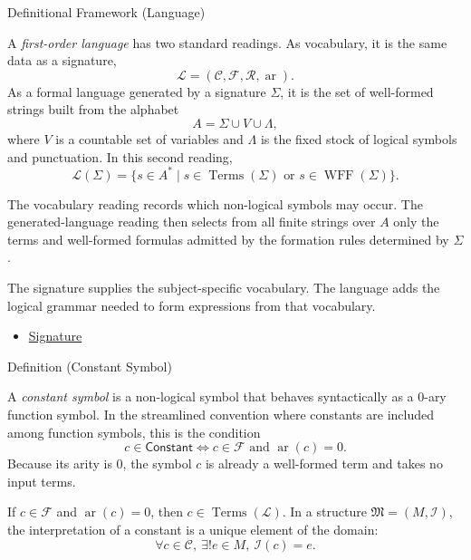 \begin{definitionalbox}{Definitional Framework (Language)}
\begin{definition}[Language]
\label{def:language}
A \emph{first-order language} has two standard readings. As vocabulary, it is
the same data as a signature,
\[
  \mathcal{L}=(\mathcal{C},\mathcal{F},\mathcal{R},\operatorname{ar}).
\]
As a formal language generated by a signature $\Sigma$, it is the set of
well-formed strings built from the alphabet
\[
  A=\Sigma\cup V\cup\Lambda,
\]
where $V$ is a countable set of variables and $\Lambda$ is the fixed stock of
logical symbols and punctuation. In this second reading,
\[
  \mathcal{L}(\Sigma)
  =\{s\in A^* \mid s\in\operatorname{Terms}(\Sigma)
    \text{ or } s\in\operatorname{WFF}(\Sigma)\}.
\]
\end{definition}
\end{definitionalbox}

\begin{remark*}
The vocabulary reading records which non-logical symbols may occur. The
generated-language reading then selects from all finite strings over $A$ only
the terms and well-formed formulas admitted by the formation rules determined
by $\Sigma$.
\end{remark*}

\begin{remark*}[Interpretation]
The signature supplies the subject-specific vocabulary. The language adds the
logical grammar needed to form expressions from that vocabulary.
\end{remark*}

\begin{dependencies}
\begin{itemize}
  \item \hyperref[def:signature]{Signature}
\end{itemize}
\end{dependencies}

\begin{definitionbox}{Definition (Constant Symbol)}
\begin{definition}
\label{def:signature-constant-symbol}
A \emph{constant symbol} is a non-logical symbol that behaves syntactically as
a $0$-ary function symbol. In the streamlined convention where constants are
included among function symbols, this is the condition
\[
  c\in\mathsf{Constant}
  \iff c\in\mathcal{F}\text{ and }\operatorname{ar}(c)=0.
\]
Because its arity is $0$, the symbol $c$ is already a well-formed term and
takes no input terms.
\end{definition}
\end{definitionbox}
\begin{remark*}
If $c\in\mathcal{F}$ and $\operatorname{ar}(c)=0$, then
$c\in\operatorname{Terms}(\mathcal{L})$. In a structure
$\mathfrak{M}=(M,\mathcal{I})$, the interpretation of a constant is a unique
element of the domain:
\[
  \forall c\in\mathcal{C},\ \exists! e\in M,\ \mathcal{I}(c)=e.
\]
\end{remark*}

